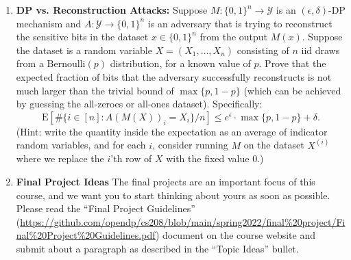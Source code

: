 \documentclass[11pt]{article}
\newcommand{\zo}{\{0,1\}}
\begin{document}
\begin{enumerate}[leftmargin=*]
\begin{enumerate}
\end{enumerate}

\item \textbf{DP vs. Reconstruction Attacks:}  Suppose $M : \zo^n\rightarrow \mathcal{Y}$ is an $(\epsilon,\delta)$-DP mechanism
and $A : \mathcal{Y}\rightarrow \zo^n$ is an adversary that is trying to reconstruct the sensitive bits in the dataset $x\in \zo^n$ from
the output $M(x)$.   Suppose the dataset is a random variable $X=(X_1,\ldots,X_n)$ consisting of $n$ iid draws from a $\mathrm{Bernoulli}(p)$ distribution, for a known value of $p$.   Prove that the expected fraction of bits that the adversary successfully reconstructs is not much larger than the trivial bound of $\max\{p,1-p\}$ (which can be achieved by guessing the all-zeroes or all-ones dataset).  Specifically:
$$\mathrm{E}\left[\#\{ i\in [n] : A(M(X))_i=X_i\}/n\right]\leq e^{\epsilon} \cdot \max\{p,1-p\}+\delta.$$
(Hint: write the quantity inside the expectation
as an average of indicator random variables, and for each
$i$, consider running $M$ on the dataset $X^{(i)}$ where
we replace the $i$'th row of $X$ with the fixed value 0.)



\item \textbf{Final Project Ideas} 
The final projects are an important focus of this course, and we want you to start thinking about yours as soon as possible.  Please read the
``Final Project Guidelines'' (\url{https://github.com/opendp/cs208/blob/main/spring2022/final%20project/Final%20Project%20Guidelines.pdf})
document on the course website and
submit about a paragraph as described in the ``Topic Ideas'' bullet.


\end{enumerate}
\end{document}
